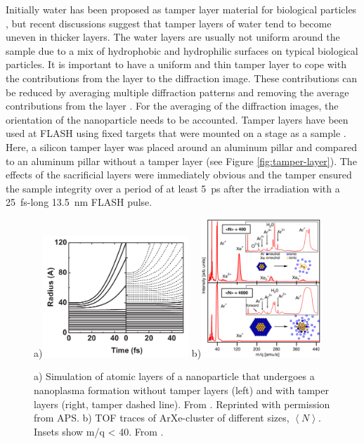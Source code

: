 %
Initially water has been proposed as tamper layer material for biological particles \citep{Hau-Riege-2007-PRL,Jurek-2008-EPJ}, but recent discussions \citep{Aquila-2015-StrucDyn} suggest that tamper layers of water tend to become uneven in thicker layers. The water layers are usually not uniform around the sample due to a mix of hydrophobic and hydrophilic surfaces on typical biological particles. It is important to have a uniform and thin tamper layer to cope with the contributions from the layer to the diffraction image. These contributions can be reduced by averaging multiple diffraction patterns and removing the average contributions from the layer \citep{Hau-Riege-2007-PRL,Maia-2009-PRE}. For the averaging of the diffraction images, the orientation of the nanoparticle needs to be accounted. Tamper layers have been used at FLASH using fixed targets that were mounted on a stage as a sample \citep{Hau-Riege-2010-PRL}. Here, a silicon tamper layer was placed around an aluminum pillar and compared to an aluminum pillar without a tamper layer (see Figure \ref{fig:tamper-layer}). The effects of the sacrificial layers were immediately obvious and the tamper ensured the sample integrity over a period of at least \SI{5}{\pico\second} after the irradiation with a \SI{25}{\femto\second}-long \SI{13.5}{\nano\meter} FLASH pulse.\\[1\baselineskip]
%
\begin{figure}
	\centering
		a)\includegraphics[width=0.49\textwidth]{images/tamper-layers.png}
		b)\includegraphics[width=0.4\textwidth]{images/Hoener-image.jpg}
	\caption[Tamper layers and nanoparticles that undergo a nanoplasma formation.]{a) Simulation of atomic layers of a nanoparticle that undergoes a nanoplasma formation without tamper layers (left) and with tamper layers (right, tamper dashed line). From \citep{Hau-Riege-2007-PRL}. Reprinted with permission from APS. b) TOF traces of ArXe-cluster of different sizes, $\left\langle N\right\rangle$. Insets show m/q < 40. From \cite{Hoener-2008-JPB}.}
	\label{fig:sacrificial-image}
\end{figure}
